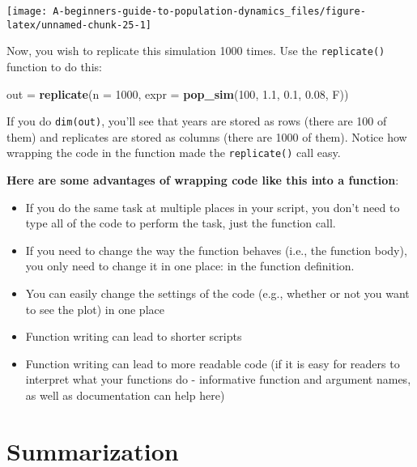 \documentclass[]{book}
\newenvironment{Shaded}{\begin{snugshade}}{\end{snugshade}}
\newcommand{\DataTypeTok}[1]{\textcolor[rgb]{0.13,0.29,0.53}{#1}}
\newcommand{\DecValTok}[1]{\textcolor[rgb]{0.00,0.00,0.81}{#1}}
\newcommand{\FloatTok}[1]{\textcolor[rgb]{0.00,0.00,0.81}{#1}}
\newcommand{\KeywordTok}[1]{\textcolor[rgb]{0.13,0.29,0.53}{\textbf{#1}}}
\newcommand{\NormalTok}[1]{#1}
\newcommand{\StringTok}[1]{\textcolor[rgb]{0.31,0.60,0.02}{#1}}
\providecommand{\tightlist}{%
  \setlength{\itemsep}{0pt}\setlength{\parskip}{0pt}}
\begin{document}
\begin{center}\texttt{[image: A-beginners-guide-to-population-dynamics\_files/figure-latex/unnamed-chunk-25-1]} \end{center}

Now, you wish to replicate this simulation 1000 times. Use the \texttt{replicate()} function to do this:

\begin{Shaded}
\begin{Highlighting}[]
\NormalTok{out =}\StringTok{ }\KeywordTok{replicate}\NormalTok{(}\DataTypeTok{n =} \DecValTok{1000}\NormalTok{, }\DataTypeTok{expr =} \KeywordTok{pop_sim}\NormalTok{(}\DecValTok{100}\NormalTok{, }\FloatTok{1.1}\NormalTok{, }\FloatTok{0.1}\NormalTok{, }\FloatTok{0.08}\NormalTok{, F))}
\end{Highlighting}
\end{Shaded}

If you do \texttt{dim(out)}, you'll see that years are stored as rows (there are 100 of them) and replicates are stored as columns (there are 1000 of them). Notice how wrapping the code in the function made the \texttt{replicate()} call easy.

\textbf{Here are some advantages of wrapping code like this into a function}:

\begin{itemize}
\tightlist
\item
  If you do the same task at multiple places in your script, you don't need to type all of the code to perform the task, just the function call.
\item
  If you need to change the way the function behaves (i.e., the function body), you only need to change it in one place: in the function definition.
\item
  You can easily change the settings of the code (e.g., whether or not you want to see the plot) in one place
\item
  Function writing can lead to shorter scripts
\item
  Function writing can lead to more readable code (if it is easy for readers to interpret what your functions do - informative function and argument names, as well as documentation can help here)
\end{itemize}

\hypertarget{mc-summaries}{%
\section{Summarization}\label{mc-summaries}}
\end{document}
